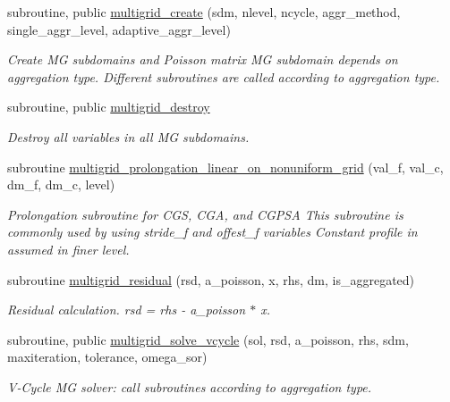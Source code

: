 \begin{DoxyCompactItemize}
\item 
subroutine, public \hyperlink{namespacemultigrid_ac8deb32ba5698e37f75c369dc063b277}{multigrid\+\_\+create} (sdm, nlevel, ncycle, aggr\+\_\+method, single\+\_\+aggr\+\_\+level, adaptive\+\_\+aggr\+\_\+level)
\begin{DoxyCompactList}\small\item\em Create MG subdomains and Poisson matrix  MG subdomain depends on aggregation type. Different subroutines are called according to aggregation type. \end{DoxyCompactList}\item 
\mbox{\label{namespacemultigrid_a07ed47be36b2e0df9d71ec58151b642b}} 
subroutine, public \hyperlink{namespacemultigrid_a07ed47be36b2e0df9d71ec58151b642b}{multigrid\+\_\+destroy}
\begin{DoxyCompactList}\small\item\em Destroy all variables in all MG subdomains. \end{DoxyCompactList}\item 
subroutine \hyperlink{namespacemultigrid_a839d1e13e2d0bac4959deec5669d4171}{multigrid\+\_\+prolongation\+\_\+linear\+\_\+on\+\_\+nonuniform\+\_\+grid} (val\+\_\+f, val\+\_\+c, dm\+\_\+f, dm\+\_\+c, level)
\begin{DoxyCompactList}\small\item\em Prolongation subroutine for C\+GS, C\+GA, and C\+G\+P\+SA  This subroutine is commonly used by using stride\+\_\+f and offest\+\_\+f variables Constant profile in assumed in finer level. \end{DoxyCompactList}\item 
subroutine \hyperlink{namespacemultigrid_ad1ba34848f786afdf0e91afb3d3be819}{multigrid\+\_\+residual} (rsd, a\+\_\+poisson, x, rhs, dm, is\+\_\+aggregated)
\begin{DoxyCompactList}\small\item\em Residual calculation. rsd = rhs -\/ a\+\_\+poisson $\ast$ x. \end{DoxyCompactList}\item 
subroutine, public \hyperlink{namespacemultigrid_a7d60c9d01777350a79ff7bd975a90121}{multigrid\+\_\+solve\+\_\+vcycle} (sol, rsd, a\+\_\+poisson, rhs, sdm, maxiteration, tolerance, omega\+\_\+sor)
\begin{DoxyCompactList}\small\item\em V-\/\+Cycle MG solver\+: call subroutines according to aggregation type. \end{DoxyCompactList}\item 

\end{DoxyCompactItemize}
